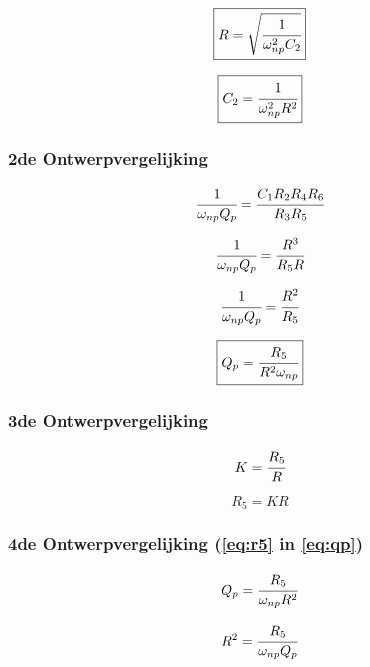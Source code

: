 \documentclass[]{article}
\begin{document}
\begin{equation} \label{eq:r}
\boxed{R = \sqrt{\cfrac{1}{\omega_{np}^{2}C_{2}}}}
\end{equation}

\begin{equation} \label{eq:c2}
\boxed{C_{2} = \cfrac{1}{\omega_{np}^{2}R^{2}}}
\end{equation}

\subsubsection*{2de Ontwerpvergelijking}
\begin{equation*}
\cfrac{1}{\omega_{np}Q_{p}} = \cfrac{C_{1}R_{2}R_{4}R_{6}}{R_{3}R_{5}} 
\end{equation*}

\begin{equation*}
\cfrac{1}{\omega_{np}Q_{p}} = \cfrac{R^{3}}{R_{5}R} 
\end{equation*}

\begin{equation*}
\cfrac{1}{\omega_{np}Q_{p}} = \cfrac{R^{2}}{R_{5}} 
\end{equation*}

\begin{equation} \label{eq:qp}
\boxed{Q_{p} = \cfrac{R_{5}}{R^{2}\omega_{np}}}
\end{equation}

\subsubsection*{3de Ontwerpvergelijking}

\begin{equation*}
K = \cfrac{R_{5}}{R} 
\end{equation*}

\begin{equation} \label{eq:r5}
\boxed{R_{5} = KR}
\end{equation}

\subsubsection*{4de Ontwerpvergelijking (\ref{eq:r5} in \ref{eq:qp})}

\begin{equation*}
Q_{p} = \cfrac{R_{5}}{\omega_{np}R^{2}}
\end{equation*}

\begin{equation*}
R^{2} = \cfrac{R_{5}}{\omega_{np}Q_{p}}
\end{equation*}
\end{document}
